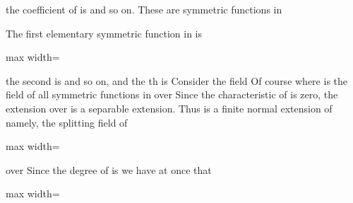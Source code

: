 \documentclass[11pt,oneside]{article}
\begin{document}
\begin{BookBody}
\noindent the coefficient of  is  and so on. These are symmetric functions in 

The first elementary symmetric function in  is

\begin{center}\begin{adjustbox}{max width=\linewidth}\end{adjustbox}\end{center}

\noindent the second is  and so on, and the th is  Consider the field  Of course where  is the field of all symmetric functions in  over  Since the characteristic of  is zero, the extension  over  is a separable extension. Thus  is a finite normal extension of  namely, the splitting field of

\begin{center}\begin{adjustbox}{max width=\linewidth}\end{adjustbox}\end{center}

\noindent over  Since the degree of  is  we have at once that

\begin{center}\begin{adjustbox}{max width=\linewidth}\end{adjustbox}\end{center}

\end{BookBody}

\BookNarrativetrue
\end{document}
